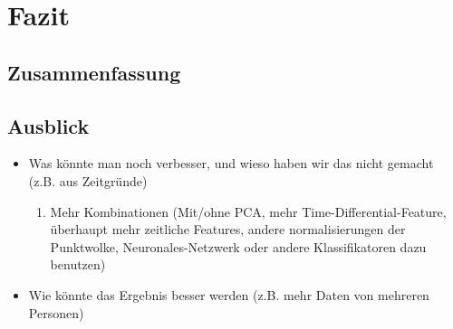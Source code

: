 \chapter{Fazit}
\section{Zusammenfassung}
\section{Ausblick}
\begin{itemize}
  \item Was könnte man noch verbesser, und wieso haben wir das nicht gemacht (z.B. aus Zeitgründe)
    \begin{enumerate}
      \item Mehr Kombinationen (Mit/ohne PCA, mehr Time-Differential-Feature, überhaupt mehr zeitliche Features, andere normalisierungen der Punktwolke, Neuronales-Netzwerk oder andere Klassifikatoren dazu benutzen)
    \end{enumerate}
  \item Wie könnte das Ergebnis besser werden (z.B. mehr Daten von mehreren Personen)
\end{itemize}
